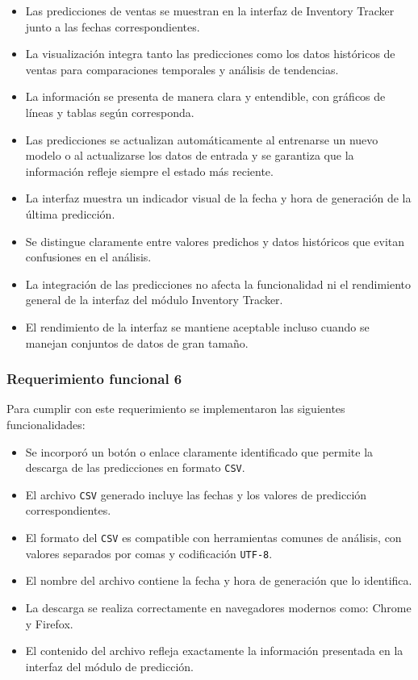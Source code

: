 \begin{itemize}
    \item Las predicciones de ventas se muestran en la interfaz de Inventory Tracker junto a las fechas correspondientes.
    \item La visualización integra tanto las predicciones como los datos históricos de ventas para comparaciones temporales y análisis de tendencias.
    \item La información se presenta de manera clara y entendible, con gráficos de líneas y tablas según corresponda.
    \item Las predicciones se actualizan automáticamente al entrenarse un nuevo modelo o al actualizarse los datos de entrada y se garantiza que la información refleje siempre el estado más reciente.
    \item La interfaz muestra un indicador visual de la fecha y hora de generación de la última predicción.
    \item Se distingue claramente entre valores predichos y datos históricos que evitan confusiones en el análisis.
    \item La integración de las predicciones no afecta la funcionalidad ni el rendimiento general de la interfaz del módulo Inventory Tracker.
    \item El rendimiento de la interfaz se mantiene aceptable incluso cuando se manejan conjuntos de datos de gran tamaño.
\end{itemize}


\subsubsection{Requerimiento funcional 6}


Para cumplir con este requerimiento se implementaron las siguientes funcionalidades:

\begin{itemize}
    \item Se incorporó un botón o enlace claramente identificado que permite la descarga de las predicciones en formato \texttt{CSV}.
    \item El archivo \texttt{CSV} generado incluye las fechas y los valores de predicción correspondientes.
    \item El formato del \texttt{CSV} es compatible con herramientas comunes de análisis, con valores separados por comas y codificación \texttt{UTF-8}.
    \item El nombre del archivo contiene la fecha y hora de generación que lo identifica.
    \item La descarga se realiza correctamente en navegadores modernos como: Chrome y Firefox.
    \item El contenido del archivo refleja exactamente la información presentada en la interfaz del módulo de predicción.
\end{itemize}

